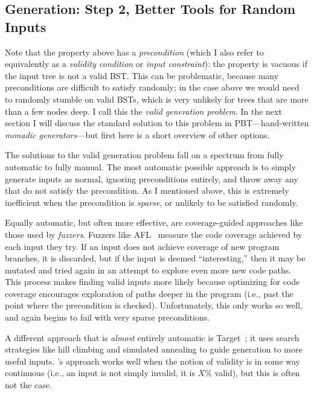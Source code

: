 \subsection{Generation: Step 2, Better Tools for Random Inputs }
%
%
Note that the property above has a {\em precondition} (which I also refer to
equivalently as a {\em validity condition} or {\em input constraint}): the
property is vacuous if the input tree is not a valid BST. This can be problematic,
because many preconditions are difficult to satisfy randomly; in the case above
we would need to randomly stumble on valid BSTs, which is very unlikely for
trees that are more than a few nodes deep. I call this the {\em valid generation
problem}. In the next section I will discuss the standard solution to this
problem in PBT---hand-written {\em monadic generators}---but first here is a
short overview of other options.

The solutions to the valid generation problem fall on a spectrum from fully
automatic to fully manual. The most automatic possible approach is to simply
generate inputs as normal, ignoring preconditions entirely, and throw away any
that do not satisfy the precondition. As I mentioned above, this is extremely
inefficient when the precondition is {\em sparse}, or unlikely to be satisfied
randomly.

Equally automatic, but often more effective, are coverage-guided approaches like
those used by {\em fuzzers}. Fuzzers like AFL~\cite{afl-readme} measure the code
coverage achieved by each input they try. If an input does not achieve coverage
of new program branches, it is discarded, but if the input is deemed
``interesting,'' then it may be mutated and tried again in an attempt to explore
even more new code paths. This process makes finding valid inputs more likely
because optimizing for code coverage encourages exploration of paths deeper in
the program (i.e., past the point where the precondition is checked).
Unfortunately, this only works so well, and again begins to fail with very
sparse preconditions.

A different approach that is {\em almost} entirely automatic is {\sc
Target}~\cite{loscher2017targetedpbt}; it uses search strategies like hill
climbing and simulated annealing to guide generation to more useful inputs.
\citeauthor{loscher2017targetedpbt}'s approach works well when the notion of
validity is in some way continuous (i.e., an input is not simply invalid, it is
$X\%$ valid), but this is often not the case.

